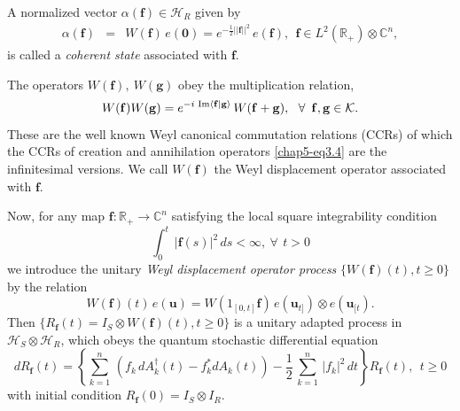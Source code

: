 A normalized vector $\alpha(\mathbf{f})\in\mathcal{H}_R$  given by    
\begin{eqnarray} 
\alpha(\mathbf{f})&=&W(\mathbf{f})\, e(\mathbf{0}) =  e^{-\frac{1}{2} ||\mathbf{f}||^{2}}\, e (\mathbf{f}), \ \ 
\mathbf{f}\in L^2(\mathbb{R_+})\otimes \mathbb{C}^n,    \label{chap5-eq4.6}
\end{eqnarray} 
is called a {\it coherent state} associated with $\mathbf{f}$.  

The operators $W(\mathbf{f}),\ W(\mathbf{g})$ obey the multiplication relation, 
\begin{equation}
W(\mathbf{f}) W(\mathbf{g}) = e^{-i \,\,{\rm Im} \langle \mathbf{f}|\mathbf{g} \rangle}\, W(\mathbf{f}+\mathbf{g}),\ \ \forall\, \ \mathbf{f},\mathbf{g}\in \mathcal{K}. \label{chap5-eq4.7}
\end{equation}
These are the well known Weyl canonical commutation relations (CCRs) of which the CCRs of creation and annihilation operators \eqref{chap5-eq3.4} are the infinitesimal versions. We call  $W(\mathbf{f})$ the Weyl displacement operator associated with $\mathbf{f}.$ 

Now, for any map $\mathbf{f}:\mathbb{R}_+\rightarrow \mathbb{C}^n$ satisfying the local square integrability condition 
$$
\int_0^{t}\,   \vert \mathbf{f}(s)\vert^2 \, ds < \infty, \ \forall\, \ t>0 
$$
we introduce the unitary {\it Weyl displacement operator process} $\{W(\mathbf{f})(t) , t\geq 0\}$ by the relation  
\begin{equation} 
W(\mathbf{f})(t)\, e(\mathbf{u})= W(1_{[0,t]} \mathbf{f})\, e(\mathbf{u}_{t]}) \otimes e(\mathbf{u}_{[t}). \label{chap5-eq4.8}
\end{equation} 
Then $\{R_{\mathbf{f}}(t)=I_S\otimes W(\mathbf{f})(t), t\geq 0\}$ is a unitary adapted  process in $\mathcal{H}_S\otimes \mathcal{H}_R$, which obeys the quantum stochastic differential equation 
{\fontsize{9pt}{11pt}\selectfont
\begin{equation}
dR_{\mathbf{f}}(t)=\left\{\sum_{k=1}^n\, \left(f_k\, dA^\dag_k(t) - f_k^* dA_k(t) \right) -\frac{1}{2}\,\sum_{k=1}^n\, \vert f_k\vert^2\, dt \right\}\! R_{\mathbf{f}}(t),\ \ t\geq 0 \label{chap5-eq4.9}
\end{equation} }
with  initial condition $R_{\mathbf{f}}(0)=I_S\otimes I_{R}$. 

